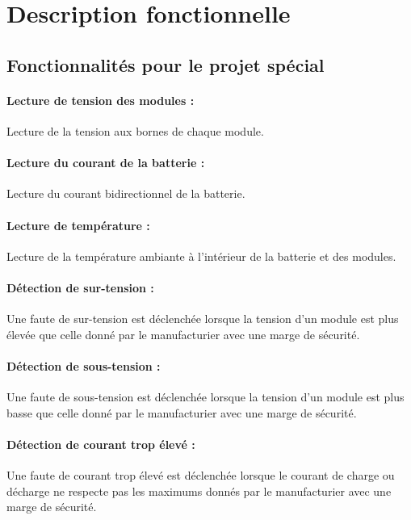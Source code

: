 
\section{Description fonctionnelle}

	\subsection{Fonctionnalités pour le projet spécial}
	
		\paragraph{Lecture de tension des modules :} 
		Lecture de la tension aux bornes de chaque module.
		
		\paragraph{Lecture du courant de la batterie :}
		Lecture du courant bidirectionnel de la batterie.
		
		\paragraph{Lecture de température :}
		Lecture de la température ambiante à l'intérieur de la batterie et des modules. 
		
		\paragraph{Détection de sur-tension :}
		Une faute de sur-tension est déclenchée lorsque la tension d'un module est plus élevée que celle donné par le manufacturier avec une marge de sécurité.  
		
		\paragraph{Détection de sous-tension :}
		Une faute de sous-tension est déclenchée lorsque la tension d'un module est plus basse que celle donné par le manufacturier avec une marge de sécurité.
		
		\paragraph{Détection de courant trop élevé :}
		Une faute de courant trop élevé est déclenchée lorsque le courant de charge ou décharge ne respecte pas les maximums donnés par le manufacturier avec une marge de sécurité.
		
